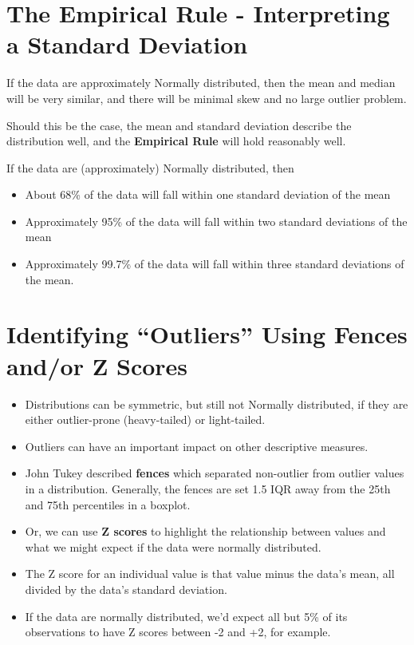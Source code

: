 \documentclass[
]{book}
\providecommand{\tightlist}{%
  \setlength{\itemsep}{0pt}\setlength{\parskip}{0pt}}
\begin{document}
\hypertarget{the-empirical-rule---interpreting-a-standard-deviation}{%
\section{The Empirical Rule - Interpreting a Standard Deviation}\label{the-empirical-rule---interpreting-a-standard-deviation}}

If the data are approximately Normally distributed, then the mean and median will be very similar, and there will be minimal skew and no large outlier problem.

Should this be the case, the mean and standard deviation describe the distribution well, and the \textbf{Empirical Rule} will hold reasonably well.

If the data are (approximately) Normally distributed, then

\begin{itemize}
\tightlist
\item
  About 68\% of the data will fall within one standard deviation of the mean
\item
  Approximately 95\% of the data will fall within two standard deviations of the mean
\item
  Approximately 99.7\% of the data will fall within three standard deviations of the mean.
\end{itemize}

\hypertarget{identifying-outliers-using-fences-andor-z-scores}{%
\section{Identifying ``Outliers'' Using Fences and/or Z Scores}\label{identifying-outliers-using-fences-andor-z-scores}}

\begin{itemize}
\tightlist
\item
  Distributions can be symmetric, but still not Normally distributed, if they are either outlier-prone (heavy-tailed) or light-tailed.
\item
  Outliers can have an important impact on other descriptive measures.
\item
  John Tukey described \textbf{fences} which separated non-outlier from outlier values in a distribution. Generally, the fences are set 1.5 IQR away from the 25th and 75th percentiles in a boxplot.
\item
  Or, we can use \textbf{Z scores} to highlight the relationship between values and what we might expect if the data were normally distributed.
\item
  The Z score for an individual value is that value minus the data's mean, all divided by the data's standard deviation.
\item
  If the data are normally distributed, we'd expect all but 5\% of its observations to have Z scores between -2 and +2, for example.
\end{itemize}
\end{document}
